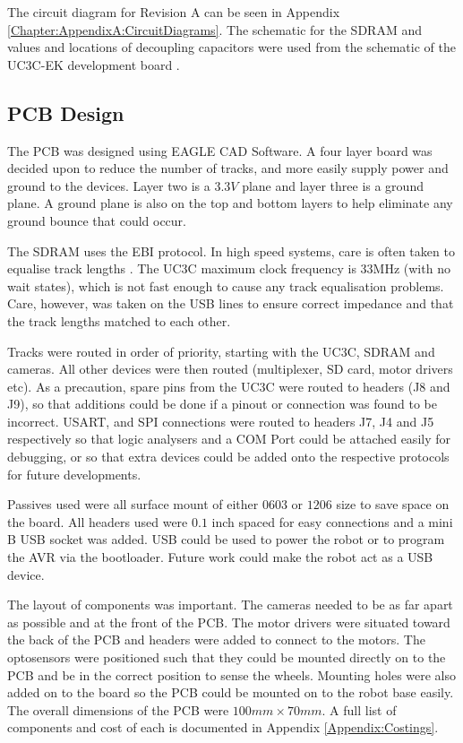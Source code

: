 \begin{table}
\begin{tabular}{ccccc}
\end{tabular}
\end{table}

The circuit diagram for Revision A can be seen in Appendix \ref{Chapter:AppendixA:CircuitDiagrams}. The schematic for the SDRAM and values and locations of decoupling capacitors were used from the schematic of the UC3C-EK development board \citep{Atmel:UC3CEK}. 
\subsection{PCB Design}
The PCB was designed using EAGLE CAD Software. A four layer board was decided upon to reduce the number of tracks, and more easily supply power and ground to the devices. Layer two is a $3.3V$ plane and layer three is a ground plane. A ground plane is also on the top and bottom layers to help eliminate any ground bounce that could occur. 

The SDRAM uses the EBI protocol. In high speed systems, care is often taken to equalise track lengths \citep{liu2004equalization}. The UC3C maximum clock frequency is 33MHz (with no wait states), which is not fast enough to cause any track equalisation problems. Care, however, was taken on the USB lines to ensure correct impedance and that the track lengths matched to each other.

Tracks were routed in order of priority, starting with the UC3C, SDRAM and cameras. All other devices were then routed (\itc multiplexer, SD card, motor drivers etc). As a precaution, spare pins from the UC3C were routed to headers (J8 and J9), so that additions could be done if a pinout or connection was found to be incorrect. USART, \itc and SPI connections were routed to headers J7, J4 and J5 respectively so that logic analysers and a COM Port could be attached easily for debugging, or so that extra devices could be added onto the respective protocols for future developments. 

Passives used were all surface mount of either $0603$ or $1206$ size to save space on the board. All headers used were $0.1$ inch spaced for easy connections and a mini B USB socket was added. USB could be used to power the robot or to program the AVR via the bootloader. Future work could make the robot act as a USB device. 

The layout of components was important. The cameras needed to be as far apart as possible and at the front of the PCB. The motor drivers were situated toward the back of the PCB and headers were added to connect to the motors. The optosensors were positioned such that they could be mounted directly on to the PCB and be in the correct position to sense the wheels. Mounting holes were also added on to the board so the PCB could be mounted on to the robot base easily. The overall dimensions of the PCB were $100mm \times 70mm$. A full list of components and cost of each is documented in Appendix \ref{Appendix:Costings}.

